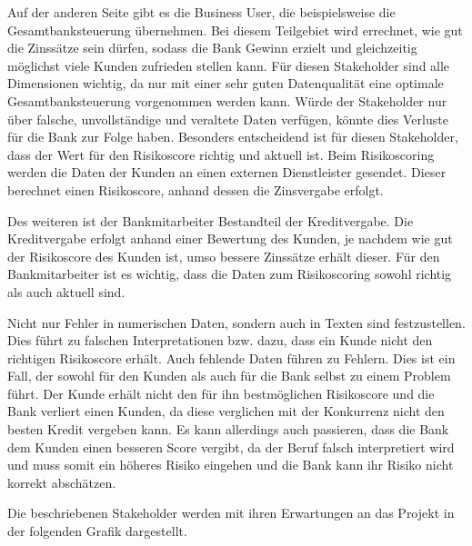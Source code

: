 Auf der anderen Seite gibt es die Business User, die beispielsweise die Gesamtbanksteuerung übernehmen.
Bei diesem Teilgebiet wird errechnet, wie gut die Zinssätze sein dürfen, sodass die Bank Gewinn erzielt und gleichzeitig möglichst viele Kunden zufrieden stellen kann.
Für diesen Stakeholder sind alle Dimensionen wichtig, da nur mit einer sehr guten Datenqualität eine optimale Gesamtbanksteuerung vorgenommen werden kann. 
Würde der Stakeholder nur über falsche, unvollständige und veraltete Daten verfügen, könnte dies Verluste für die Bank zur Folge haben.
Besonders entscheidend ist für diesen Stakeholder, dass der Wert für den Risikoscore richtig und aktuell ist.
Beim Risikoscoring werden die Daten der Kunden an einen externen Dienstleister gesendet.
Dieser berechnet einen Risikoscore, anhand dessen die Zinsvergabe erfolgt.

Des weiteren ist der Bankmitarbeiter Bestandteil der Kreditvergabe. 
Die Kreditvergabe erfolgt anhand einer Bewertung des Kunden, je nachdem wie gut der Risikoscore des Kunden ist, umso bessere Zinssätze erhält dieser.
Für den Bankmitarbeiter ist es wichtig, dass die Daten zum Risikoscoring sowohl richtig als auch aktuell sind.

Nicht nur Fehler in numerischen Daten, sondern auch in Texten sind festzustellen. 
Dies führt zu falschen Interpretationen bzw. dazu, dass ein Kunde nicht den richtigen Risikoscore erhält. 
Auch fehlende Daten führen zu Fehlern.
Dies ist ein Fall, der sowohl für den Kunden als auch für die Bank selbst zu einem Problem führt. 
Der Kunde erhält nicht den für ihn bestmöglichen Risikoscore und die Bank verliert einen Kunden, da diese verglichen mit der Konkurrenz nicht den besten Kredit vergeben kann. 
Es kann allerdings auch passieren, dass die Bank dem Kunden einen besseren Score vergibt, da der Beruf falsch interpretiert wird und muss somit ein höheres Risiko eingehen und die Bank kann ihr Risiko nicht korrekt abschätzen. 






Die beschriebenen Stakeholder werden mit ihren Erwartungen an das Projekt in der folgenden Grafik dargestellt.
